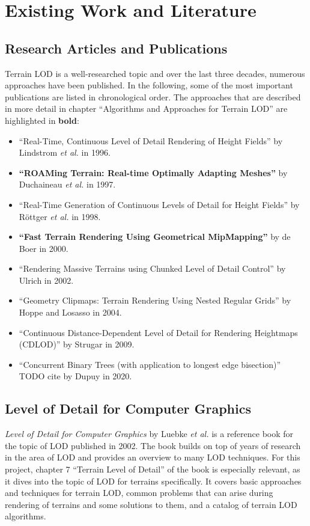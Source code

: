 \chapter{Existing Work and Literature}
\section{Research Articles and Publications}
Terrain LOD is a well-researched topic and over the last three decades, numerous approaches have been published.
In the following, some of the most important publications are listed in chronological order.
The approaches that are described in more detail in chapter ``Algorithms and Approaches for Terrain LOD'' are highlighted in \textbf{bold}:
\begin{itemize}
  \item ``Real-Time, Continuous Level of Detail Rendering of Height Fields'' \cite{lindstrom1996} by Lindstrom \textit{et al.} in 1996.
  \item \textbf{``ROAMing Terrain: Real-time Optimally Adapting Meshes''} \cite{roam} by Duchaineau \textit{et al.} in 1997.
  \item ``Real-Time Generation of Continuous Levels of Detail for Height Fields'' \cite{rottgerpaper} by Röttger \textit{et al.} in 1998.
  \item \textbf{``Fast Terrain Rendering Using Geometrical MipMapping''}  \cite{geomipmapping} by de Boer in 2000.
  \item ``Rendering Massive Terrains using Chunked Level of Detail Control'' \cite{chunkedlod} by Ulrich in 2002.
  \item ``Geometry Clipmaps: Terrain Rendering Using Nested Regular Grids'' \cite{geomclipmaps} by Hoppe and Losasso in 2004.
  \item ``Continuous Distance-Dependent Level of Detail for Rendering Heightmaps (CDLOD)'' \cite{cdlod} by Strugar in 2009.
  \item ``Concurrent Binary Trees (with application to longest edge bisection)'' TODO cite by Dupuy in 2020.
\end{itemize}

\section{Level of Detail for Computer Graphics}
\textit{Level of Detail for Computer Graphics} by Luebke \textit{et al.} \cite{lodfor3dgraphics} 
is a reference book for the topic of 
LOD published in 2002. The book builds on top of years of research in the 
area of LOD and provides an overview to many LOD techniques. For this project,
chapter 7 ``Terrain Level of Detail'' of the book is especially relevant, 
as it dives into the topic of LOD for terrains specifically.
It covers basic approaches and techniques for terrain LOD, 
common problems that can arise during rendering of terrains and some solutions to them, 
and a catalog of terrain LOD algorithms.

